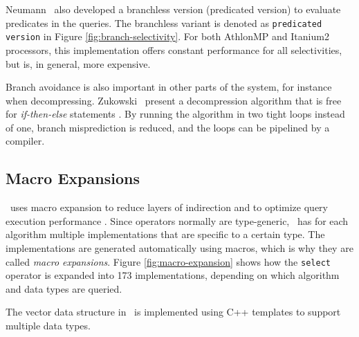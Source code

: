 Neumann \ea~also developed a branchless version (predicated version) to evaluate predicates in the queries. The branchless variant is denoted as \texttt{predicated version} in Figure \ref{fig:branch-selectivity}. For both AthlonMP and Itanium2 processors, this implementation offers constant performance for all selectivities, but is, in general, more expensive.

Branch avoidance is also important in other parts of the system, for instance when decompressing. Zukowski \ea~present a decompression algorithm that is free for \textit{if-then-else} statements \cite{Zukowski2006-oz}. By running the algorithm in two tight loops instead of one, branch misprediction is reduced, and the loops can be pipelined by a compiler.

\subsection{Macro Expansions}
\label{sub:Macro Expansions}

\monetdb~uses macro expansion to reduce layers of indirection and to optimize query execution performance \cite{Boncz2002-yj}. Since operators normally are type-generic, \monetdb~has for each algorithm multiple implementations that are specific to a certain type. The implementations are generated automatically using macros, which is why they are called \textit{macro expansions}. Figure \ref{fig:macro-expansion} shows how the \texttt{select} operator is expanded into 173 implementations, depending on which algorithm and data types are queried.

The vector data structure in \ibm~is implemented using C++ templates to support multiple data types.


